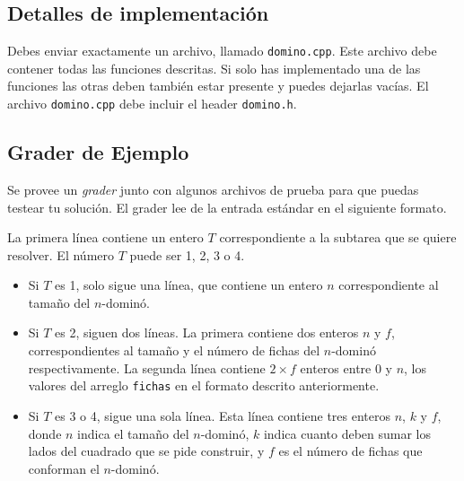 \documentclass{oci}
\begin{document}

\subsection*{Detalles de implementación}
Debes enviar exactamente un archivo, llamado \verb+domino.cpp+.
Este archivo debe contener todas las funciones descritas.
Si solo has implementado una de las funciones las otras deben también estar presente y puedes dejarlas vacías.
El archivo \verb+domino.cpp+ debe incluir el header \verb+domino.h+.

\subsection*{Grader de Ejemplo}
Se provee un \emph{grader} junto con algunos archivos de prueba para que puedas testear tu solución.
El grader lee de la entrada estándar en el siguiente formato.

La primera línea contiene un entero $T$ correspondiente a la subtarea que se quiere resolver.
El número $T$ puede ser 1, 2, 3 o 4.
\begin{itemize}
 \item Si $T$ es 1, solo sigue una línea, que contiene un entero $n$ correspondiente al tamaño del $n$-dominó.
 \item Si $T$ es 2, siguen dos líneas.
La primera contiene dos enteros $n$ y $f$, correspondientes al tamaño y el número de fichas del $n$-dominó respectivamente.
La segunda línea contiene $2\times f$ enteros entre 0 y $n$, los valores del arreglo \verb+fichas+ en el formato descrito anteriormente.
 \item Si $T$ es 3 o 4, sigue una sola línea. Esta línea contiene tres enteros $n$, $k$ y $f$, donde $n$ indica el tamaño del $n$-dominó, $k$ indica cuanto deben sumar los lados del cuadrado que se pide construir, y $f$ es el número de fichas que conforman el $n$-dominó.
\end{itemize}
\end{document}
